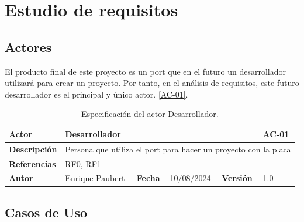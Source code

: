 \chapter{Estudio de requisitos}

\section{Actores}

El producto final de este proyecto es un port que en el futuro un desarrollador utilizará para crear un proyecto. Por tanto, en el análisis de requisitos, este futuro desarrollador es el principal y único actor. \autoref{AC-01}.

\begin{table}[!ht]
    \begin{tabular}{|llllll|}
	\hline
	\multicolumn{1}{|l|}{\textbf{Actor}}		& \multicolumn{4}{l|}{Desarrollador}	& AC-01	    \\ \hline
	\multicolumn{1}{|l|}{\textbf{Descripción}}     	& \multicolumn{5}{l|}{Persona que utiliza el port para hacer un proyecto con la placa}	    \\ \hline
	\multicolumn{1}{|l|}{\textbf{Referencias}}     	& \multicolumn{5}{l|}{RF0, RF1}	\\ \hline
	\multicolumn{1}{|l|}{\textbf{Autor}}           	& \multicolumn{1}{l|}{Enrique Paubert}        & \multicolumn{1}{l|}{\textbf{Fecha}}        & \multicolumn{1}{l|}{10/08/2024}        & \multicolumn{1}{l|}{\textbf{Versión}}       & 1.0                   \\ \hline
    \end{tabular}
    \caption[Actor: Desarrollador]{Especificación del actor Desarrollador.}
    \label{AC-01}
\end{table}

\section{Casos de Uso}


